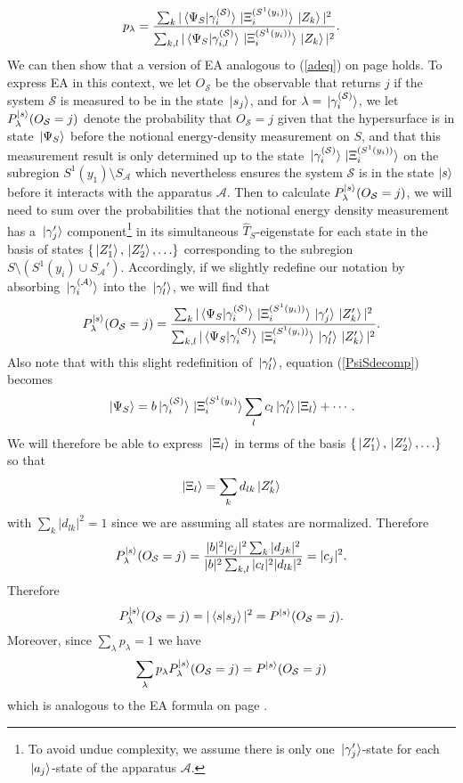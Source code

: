 \begin{equation}\label{plambda}
p_{\lambda}=\frac{\sum_k |\ip*{\Psi_S}{\gamma_i^{(\mathcal{S})}}\ket*{\Xi_i^{(S^1(y_i))}}\ket*{Z_k}|^2}{\sum_{k,l} |\ip*{\Psi_S}{\gamma_{i,l}^{(\mathcal{S})}}\ket*{\Xi_i^{(S^1(y_i))}}\ket*{Z_k}|^2}.
\end{equation}
We can then show that a version of EA analogous to (\ref{adeq}) on page \pageref{adeq} holds. To express EA in this context, we let
$O_{\mathcal{S}}$ be the observable that returns $j$ if the system $\mathcal{S}$ is measured to be in the state $\ket*{s_j}$, and for $\lambda = \ket*{\gamma_i^{(\mathcal{S})}}$, we let $P_\lambda^{\ket{s}}(O_{\mathcal{S}}=j)$ denote the probability that $O_{\mathcal{S}}=j$ given that the hypersurface is in state $\ket*{\Psi_S}$ before the notional energy-density measurement on $S$, and that this measurement result is only determined up to the state $\ket*{\gamma_i^{(\mathcal{S})}}\ket*{\Xi_i^{(S^1(y_i))}}$ on the subregion $S^1(y_1)\setminus S_{\mathcal{A}}$ which nevertheless ensures the system $\mathcal{S}$ is in the  state $\ket{s}$ before it interacts with the apparatus $\mathcal{A}$. Then to calculate $P_\lambda^{\ket{s}}(O_{\mathcal{S}}=j)$, we will need to sum over the probabilities that the notional energy density measurement has a $\ket*{\gamma_j'}$ component\footnote{To avoid undue complexity, we assume there is only one $\ket*{\gamma_j'}$-state for each $\ket*{a_j}$-state of the apparatus $\mathcal{A}$.} in its simultaneous $\hat{T}_S$-eigenstate for each state in the basis of states  $\{\ket*{Z_1'},\ket*{Z_2'},\ldots\}$ corresponding to the subregion $S\setminus(S^{1}(y_i)\cup S_{\mathcal{A}}')$. Accordingly, if we slightly redefine our notation by absorbing $\ket*{\gamma_i^{(\mathcal{A})}}$ into the $\ket*{\gamma_l'}$, we will find that   
$$P_\lambda^{\ket{s}}(O_{\mathcal{S}}=j)=\frac{\sum_k|\ip*{\Psi_S}{\gamma_i^{(\mathcal{S})}}\ket*{\Xi_i^{(S^1(y_i))}}\ket*{\gamma_j'}\ket*{Z_k'}|^2}{\sum_{k,l}|\ip*{\Psi_S}{\gamma_i^{(\mathcal{S})}}\ket*{\Xi_i^{(S^1(y_i))}}\ket*{\gamma_l'}\ket*{Z_k'}|^2}.$$ 
Also note that with this slight redefinition of $\ket*{\gamma_l'}$,  equation (\ref{PsiSdecomp}) becomes
$$\ket*{\Psi_S}=b\ket*{\gamma_i^{(\mathcal{S})}}\ket*{\Xi_i^{(S^1(y_i)}}\sum_lc_l\ket{\gamma_l'}\ket{\Xi_l}+\cdots.$$
We will therefore be able to express
$\ket*{\Xi_l}$ in terms of the basis $\{\ket*{Z_1'}, \ket*{Z_2'},\ldots  \}$ so that 
$$\ket{\Xi_l}= \sum_k d_{lk}\ket*{Z_k'}$$
with $\sum_{k}|d_{lk}|^2=1$ since we are assuming all states are normalized. Therefore
$$P_\lambda^{\ket{s}}(O_{\mathcal{S}}=j)=\frac{|b|^2|c_j|^2\sum_k |d_{jk}|^2}{|b|^2\sum_{k,l} |c_l|^2 |d_{lk}|^2}= |c_j|^2.$$
Therefore $$P_\lambda^{\ket{s}}(O_{\mathcal{S}}=j)=|\ip*{s}{s_j}|^2=P^{\ket{s}}(O_{\mathcal{S}}=j).$$ Moreover, since $\sum_\lambda p_\lambda =1$ we have 
$$\sum_\lambda p_\lambda P_\lambda^{\ket{s}}(O_{\mathcal{S}}=j)= P^{\ket{s}}(O_{\mathcal{S}}=j)$$
which is analogous to the EA formula on page \pageref{adeq}.


